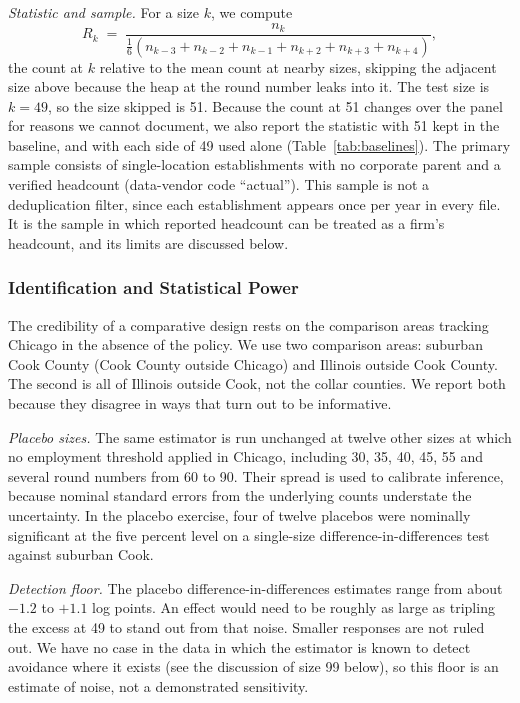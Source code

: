 \documentclass[12pt,letterpaper]{article}
\begin{document}
\textit{Statistic and sample.} For a size $k$, we compute
\[
R_k \;=\; \frac{n_k}{\tfrac{1}{6}\left(n_{k-3}+n_{k-2}+n_{k-1}+n_{k+2}+n_{k+3}+n_{k+4}\right)},
\]
the count at $k$ relative to the mean count at nearby sizes, skipping the adjacent size above because the heap at the round number leaks into it. The test size is $k=49$, so the size skipped is 51. Because the count at 51 changes over the panel for reasons we cannot document, we also report the statistic with 51 kept in the baseline, and with each side of 49 used alone (Table~\ref{tab:baselines}). The primary sample consists of single-location establishments with no corporate parent and a verified headcount (data-vendor code ``actual''). This sample is not a deduplication filter, since each establishment appears once per year in every file. It is the sample in which reported headcount can be treated as a firm's headcount, and its limits are discussed below.

\subsubsection{Identification and Statistical Power}

The credibility of a comparative design rests on the comparison areas tracking Chicago in the absence of the policy. We use two comparison areas: suburban Cook County (Cook County outside Chicago) and Illinois outside Cook County. The second is all of Illinois outside Cook, not the collar counties. We report both because they disagree in ways that turn out to be informative.

\textit{Placebo sizes.} The same estimator is run unchanged at twelve other sizes at which no employment threshold applied in Chicago, including 30, 35, 40, 45, 55 and several round numbers from 60 to 90. Their spread is used to calibrate inference, because nominal standard errors from the underlying counts understate the uncertainty. In the placebo exercise, four of twelve placebos were nominally significant at the five percent level on a single-size difference-in-differences test against suburban Cook.

\textit{Detection floor.} The placebo difference-in-differences estimates range from about $-1.2$ to $+1.1$ log points. An effect would need to be roughly as large as tripling the excess at 49 to stand out from that noise. Smaller responses are not ruled out. We have no case in the data in which the estimator is known to detect avoidance where it exists (see the discussion of size 99 below), so this floor is an estimate of noise, not a demonstrated sensitivity.
\end{document}
